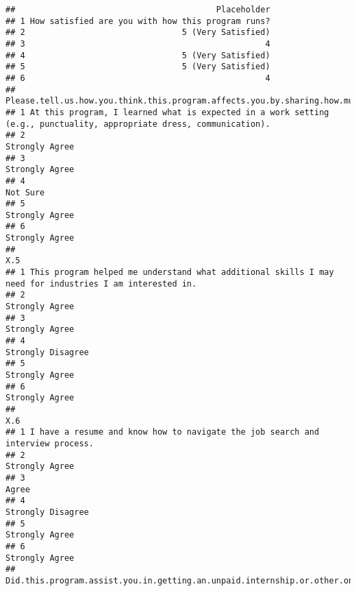 \documentclass[
]{article}
\begin{document}
\begin{verbatim}
##                                         Placeholder
## 1 How satisfied are you with how this program runs?
## 2                                5 (Very Satisfied)
## 3                                                 4
## 4                                5 (Very Satisfied)
## 5                                5 (Very Satisfied)
## 6                                                 4
##     Please.tell.us.how.you.think.this.program.affects.you.by.sharing.how.much.you.agree.with.each.of.these.statements.
## 1 At this program, I learned what is expected in a work setting (e.g., punctuality, appropriate dress, communication).
## 2                                                                                                       Strongly Agree
## 3                                                                                                       Strongly Agree
## 4                                                                                                             Not Sure
## 5                                                                                                       Strongly Agree
## 6                                                                                                       Strongly Agree
##                                                                                                      X.5
## 1 This program helped me understand what additional skills I may need for industries I am interested in.
## 2                                                                                         Strongly Agree
## 3                                                                                         Strongly Agree
## 4                                                                                      Strongly Disagree
## 5                                                                                         Strongly Agree
## 6                                                                                         Strongly Agree
##                                                                              X.6
## 1 I have a resume and know how to navigate the job search and interview process.
## 2                                                                 Strongly Agree
## 3                                                                          Agree
## 4                                                              Strongly Disagree
## 5                                                                 Strongly Agree
## 6                                                                 Strongly Agree
##   Did.this.program.assist.you.in.getting.an.unpaid.internship.or.other.on.the.job.training.

\end{verbatim}
\end{document}
